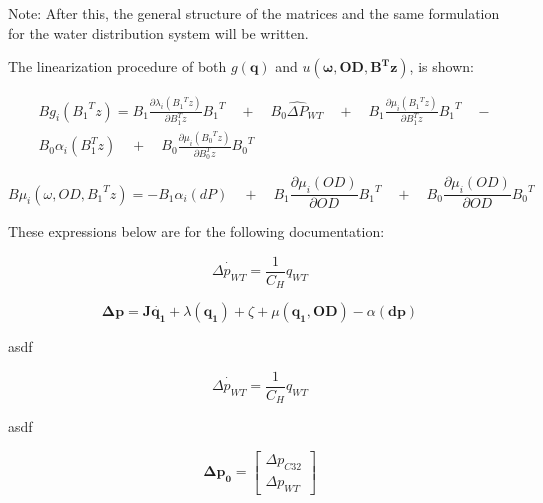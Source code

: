Note: 
After this, the general structure of the matrices and the same formulation for the water distribution system will be written. 

The linearization procedure of both $g(\pmb{q})$ and $u(\pmb{\omega},\pmb{OD}, \pmb{B^T z})$, is shown:

\begin{equation}
  \begin{split}
  & B g_{i}({B_{1}}^{T}z) = B_1 \frac{\partial{\lambda_{i}({{B_{1}}^{T}z})}}{\partial{B_{1}^{T}z}} {B_1}^{T} \quad + \quad
  B_0 {\hat{\Delta P}}_{WT} \quad + \quad B_1 \frac{\partial{\mu_{i}({{B_{1}}^{T}z})}}{\partial{B_{1}^{T}z}} {B_1}^{T} \quad - \\
  &  B_0 \alpha_{i}(B_{1}^{T}z) \quad + \quad B_0 \frac{\partial{\mu_{i}({{B_{0}}^{T}z})}}{\partial{B_{0}^{T}z}} {B_0}^{T}
  \end{split}
  \label{StateLinear}
\end{equation}

\begin{equation}
  B \mu_{i}(\omega, OD, {B_1}^{T}z) = - B_1 \alpha_{i}(dP) \quad + \quad B_1 \frac{\partial{\mu_{i}(OD)}}{\partial{OD}} {B_1}^{T}
  \quad + \quad B_0 \frac{\partial{\mu_{i}(OD)}}{\partial{OD}} {B_0}^{T}
  \label{inputlinear}
\end{equation}



 These expressions below are for the following documentation:


\begin{equation}
 \dot{\Delta p_{WT}} = \frac{1}{C_H} q_{WT}
\label{WTeq1}
\end{equation}

\begin{equation}
 \pmb{ \Delta p} = \pmb{J \dot{q_1}} + \lambda(\pmb{q_1}) + \zeta + \mu(\pmb{q_1}, \pmb{OD}) - \alpha(\pmb{dp})
\label{NonlinearPressureFunction}
\end{equation}

asdf

\begin{equation}
 \dot{\Delta p_{WT}} = \frac{1}{C_H} q_{WT}
\label{WTeq2}
\end{equation}

asdf

\begin{equation}
\pmb{\Delta p_0} =
\begin{bmatrix}
         \Delta p_{C32} \\
	\Delta p_{WT}
\end{bmatrix}
\label{pvector}
\end{equation}

